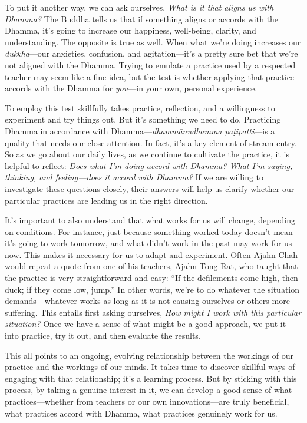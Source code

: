 To put it another way, we can ask ourselves, \emph{What is it that 
aligns us with Dhamma?} The Buddha tells us that if something aligns or 
accords with the Dhamma, it's going to increase our happiness, 
well-being, clarity, and understanding. The opposite is true as well. 
When what we're doing increases our \emph{dukkha}---our anxieties, 
confusion, and agitation---it's a pretty sure bet that we're not 
aligned with the Dhamma. Trying to emulate a practice used by a 
respected teacher may seem like a fine idea, but the test is whether 
applying that practice accords with the Dhamma for \emph{you}---in your 
own, personal experience.

To employ this test skillfully takes practice, reflection, and a 
willingness to experiment and try things out. But it's something we 
need to do. Practicing Dhamma in accordance with 
Dhamma---\emph{dhammānudhamma paṭipatti}---is a quality that needs 
our close attention. In fact, it's a key element of stream entry. So as 
we go about our daily lives, as we continue to cultivate the practice, 
it is helpful to reflect: \emph{Does what I'm doing accord with Dhamma? 
What I'm saying, thinking, and feeling---does it accord with Dhamma?} 
If we are willing to investigate these questions closely, their answers 
will help us clarify whether our particular practices are leading us in 
the right direction.

It's important to also understand that what works for us will change, 
depending on conditions. For instance, just because something worked 
today doesn't mean it's going to work tomorrow, and what didn't work in 
the past may work for us now. This makes it necessary for us to adapt 
and experiment. Often Ajahn Chah would repeat a quote from one of his 
teachers, Ajahn Tong Rat, who taught that the practice is very 
straightforward and easy: ``If the defilements come high, then duck; if 
they come low, jump.'' In other words, we're to do whatever the 
situation demands---whatever works as long as it is not causing 
ourselves or others more suffering. This entails first asking 
ourselves, \emph{How might I work with this particular situation?} Once 
we have a sense of what might be a good approach, we put it into 
practice, try it out, and then evaluate the results.

This all points to an ongoing, evolving relationship between the 
workings of our practice and the workings of our minds. It takes time 
to discover skillful ways of engaging with that relationship; it's a 
learning process. But by sticking with this process, by taking a 
genuine interest in it, we can develop a good sense of what 
practices---whether from teachers or our own innovations---are truly 
beneficial, what practices accord with Dhamma, what practices genuinely 
work for us.

